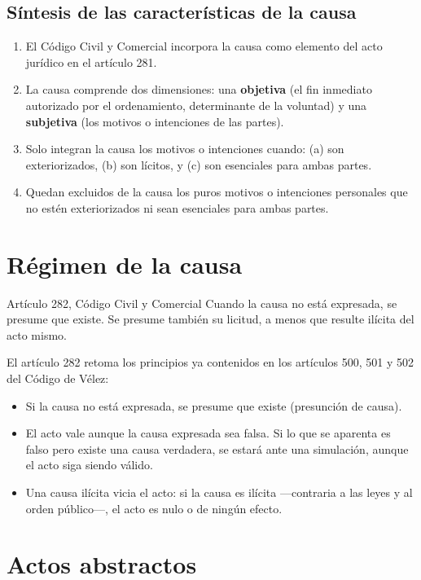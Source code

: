 \documentclass[12pt,oneside]{book}
\begin{document}
\subsection{Síntesis de las características de la causa}

\begin{enumerate}
    \item El Código Civil y Comercial incorpora la causa como elemento del acto jurídico en el artículo 281.
    \item La causa comprende dos dimensiones: una \textbf{objetiva} (el fin inmediato autorizado por el ordenamiento, determinante de la voluntad) y una \textbf{subjetiva} (los motivos o intenciones de las partes).
    \item Solo integran la causa los motivos o intenciones cuando: (a) son exteriorizados, (b) son lícitos, y (c) son esenciales para ambas partes.
    \item Quedan excluidos de la causa los puros motivos o intenciones personales que no estén exteriorizados ni sean esenciales para ambas partes.
\end{enumerate}

\section{Régimen de la causa}

\begin{definition}{Artículo 282, Código Civil y Comercial}
Cuando la causa no está expresada, se presume que existe. Se presume también su licitud, a menos que resulte ilícita del acto mismo.
\end{definition}

El artículo 282 retoma los principios ya contenidos en los artículos 500, 501 y 502 del Código de Vélez:

\begin{itemize}
    \item Si la causa no está expresada, se presume que existe (presunción de causa).
    \item El acto vale aunque la causa expresada sea falsa. Si lo que se aparenta es falso pero existe una causa verdadera, se estará ante una simulación, aunque el acto siga siendo válido.
    \item Una causa ilícita vicia el acto: si la causa es ilícita —contraria a las leyes y al orden público—, el acto es nulo o de ningún efecto.
\end{itemize}

\section{Actos abstractos}
\end{document}
